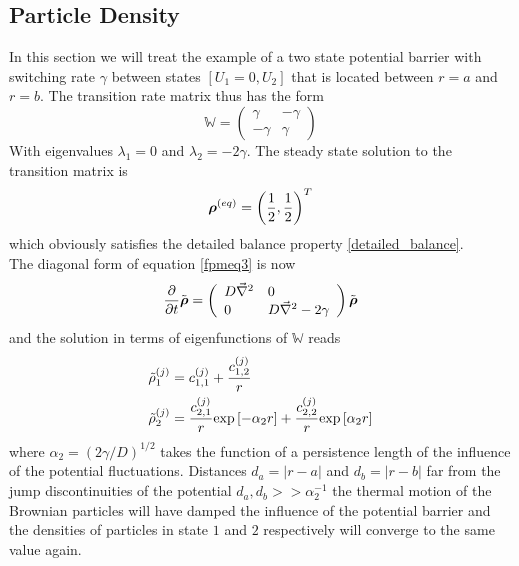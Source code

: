 \subsection{Particle Density}
In this section we will treat the example of a two state potential barrier with switching rate $\gamma$ between states $[U_1=0,U_2]$ that is located between $r = a$ and $r = b$. The transition rate matrix thus has the form 
\begin{equation}
    \mathbb{W} = \left( \begin{array}{rr}
    \gamma & -\gamma \\
    -\gamma & \gamma 
\end{array} \right)
    \label{two_state_transition_matrix}
\end{equation}
With eigenvalues $\lambda_1 = 0$ and $\lambda_2 = -2\gamma$. The steady state solution to the transition matrix is 
\begin{equation}
    \boldsymbol{\mathbf{\rho}}^{(eq)}=\left(\frac{1}{2}, \frac{1}{2}\right)^{T}
    \label{rhoeq}
\end{equation}
which obviously satisfies the detailed balance property \eqref{detailed_balance}. \\
The diagonal form of equation \eqref{fpmeq3} is now 
\begin{equation}
    \frac{\partial}{\partial t} \tilde{\boldsymbol{\mathbf{\rho}}} = \left( \begin{array}{ll}
        D\vec{\nabla}^{2} & 0 \\
        0 & D\vec{\nabla}^{2} - 2\gamma 
    \end{array} \right) \tilde{\boldsymbol{\mathbf{\rho}}}
    \label{fpmeq5}
\end{equation}
and the solution in terms of eigenfunctions of $\mathbb{W}$ reads
\begin{align}
    \tilde{\rho}_1^{(j)} &= c_{1,1}^{(j)} + \frac{c_{1,2}^{(j)}}{r} \\
    \tilde{\rho}_2^{(j)} &= \frac{c_{2,1}^{(j)}}{r}{\rm exp}\left[-\alpha_2r\right]+ \frac{c_{2,2}^{(j)}}{r}{\rm exp}\left[\alpha_2 r\right]
    \label{ind_sol_U2}
\end{align}
where $\alpha_2 = (2\gamma/D)^{1/2}$ takes the function of a persistence length of the influence of the potential fluctuations. Distances $d_a = |r - a|$ and $d_b = |r - b|$ far from the jump discontinuities of the potential $d_a, d_b >> \alpha_2^{-1}$ the thermal motion of the Brownian particles will have damped the influence of the potential barrier and the densities of particles in state $1$ and $2$ respectively will converge to the same value again.\\
